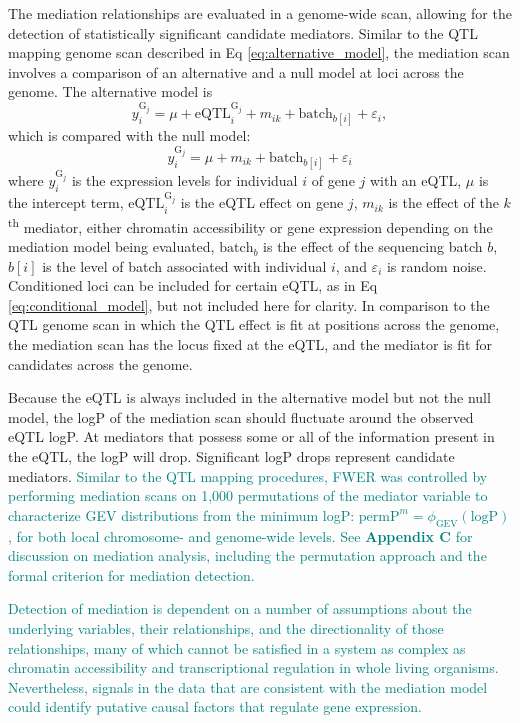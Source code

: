 \documentclass[9pt,twocolumn,twoside]{gsajnl}
\newcommand{\permpmed}{\text{permP}^{m}}
\newcommand{\GKinline}[1]{\textcolor{teal}{#1}}
\begin{document}
The mediation relationships are evaluated in a genome-wide scan, allowing for the detection of statistically significant candidate mediators. Similar to the QTL mapping genome scan described in Eq \ref{eq:alternative_model}, the mediation scan involves a comparison of an alternative and a null model at loci across the genome. The alternative model is
\begin{equation}
y^{\text{G}_{j}}_{i} = \mu + \text{eQTL}_{i}^{\text{G}_{j}} + m_{ik} + \text{batch}_{b[i]} + \varepsilon_{i},
\label{eq:mediation_alt}
\end{equation}
which is compared with the null model:
\begin{equation}
y^{\text{G}_{j}}_{i} = \mu + m_{ik} \nonumber + \text{batch}_{b[i]} + \varepsilon_{i}
\label{eq:mediation_null}
\end{equation}
where $y^{\text{G}_{j}}_{i}$ is the expression levels for individual $i$ of gene $j$ with an eQTL, $\mu$ is the intercept term, $\text{eQTL}_{i}^{\text{G}_{j}}$ is the eQTL effect on gene $j$, $m_{ik}$ is the effect of the $k$\textsuperscript{th} mediator, either chromatin accessibility or gene expression depending on the mediation model being evaluated, $\text{batch}_{b}$ is the effect of the sequencing batch $b$, $b[i]$ is the level of batch associated with individual $i$, and $\varepsilon_{i}$ is random noise. Conditioned loci can be included for certain eQTL, as in Eq \ref{eq:conditional_model}, but not included here for clarity. In comparison to the QTL genome scan in which the QTL effect is fit at positions across the genome, the mediation scan has the locus fixed at the eQTL, and the mediator is fit for candidates across the genome.

Because the eQTL is always included in the alternative model but not the null model, the logP of the mediation scan should fluctuate around the observed eQTL logP. At mediators that possess some or all of the information present in the eQTL, the logP will drop. Significant logP drops represent candidate mediators. \GKinline{Similar to the QTL mapping procedures, FWER was controlled by performing mediation scans on 1,000 permutations of the mediator variable to characterize GEV distributions from the minimum logP: $\permpmed = \phi_{\text{GEV}}(\text{logP})$, for both local chromosome- and genome-wide levels.} \GKinline{See \textbf{Appendix C} for discussion on mediation analysis, including the permutation approach and the formal criterion for mediation detection.}

\GKinline{Detection of mediation is dependent on a number of assumptions about the underlying variables, their relationships, and the directionality of those relationships, many of which cannot be satisfied in a system as complex as chromatin accessibility and transcriptional regulation in whole living organisms. Nevertheless, signals in the data that are consistent with the mediation model could identify putative causal factors that regulate gene expression.}
\end{document}
